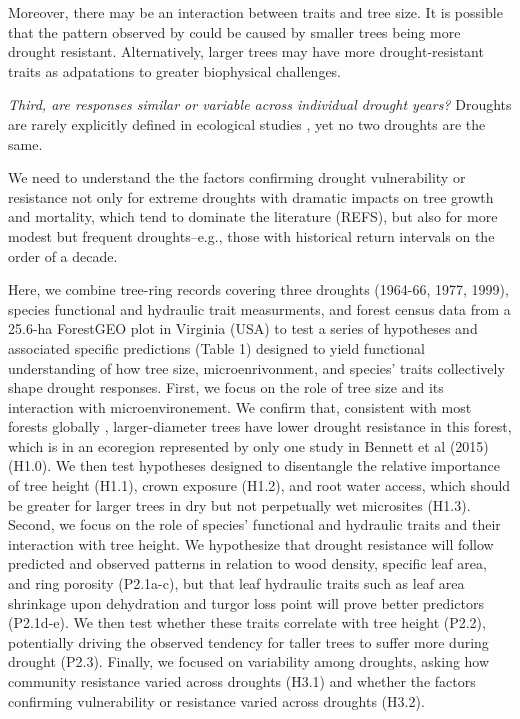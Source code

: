\documentclass[]{article}
\begin{document}
Moreover, there may be an interaction between traits and tree size. It
is possible that the pattern observed by \citet{bennett_larger_2015}
could be caused by smaller trees being more drought resistant.
Alternatively, larger trees may have more drought-resistant traits as
adpatations to greater biophysical challenges.

\emph{Third, are responses similar or variable across individual drought
years?} Droughts are rarely explicitly defined in ecological studies
\citep{slette_how_2019}, yet no two droughts are the same.

We need to understand the the factors confirming drought vulnerability
or resistance not only for extreme droughts with dramatic impacts on
tree growth and mortality, which tend to dominate the literature
\citep{bennett_larger_2015} (REFS), but also for more modest but
frequent droughts--e.g., those with historical return intervals on the
order of a decade.

Here, we combine tree-ring records covering three droughts (1964-66,
1977, 1999), species functional and hydraulic trait measurments, and
forest census data from a 25.6-ha ForestGEO plot in Virginia (USA) to
test a series of hypotheses and associated specific predictions (Table
1) designed to yield functional understanding of how tree size,
microenrivonment, and species' traits collectively shape drought
responses. First, we focus on the role of tree size and its interaction
with microenvironement. We confirm that, consistent with most forests
globally \citep{bennett_larger_2015}, larger-diameter trees have lower
drought resistance in this forest, which is in an ecoregion represented
by only one study in Bennett et al (2015) (H1.0). We then test
hypotheses designed to disentangle the relative importance of tree
height (H1.1), crown exposure (H1.2), and root water access, which
should be greater for larger trees in dry but not perpetually wet
microsites (H1.3). Second, we focus on the role of species' functional
and hydraulic traits and their interaction with tree height. We
hypothesize that drought resistance will follow predicted and observed
patterns in relation to wood density, specific leaf area, and ring
porosity (P2.1a-c), but that leaf hydraulic traits such as leaf area
shrinkage upon dehydration and turgor loss point will prove better
predictors (P2.1d-e). We then test whether these traits correlate with
tree height (P2.2), potentially driving the observed tendency for taller
trees to suffer more during drought (P2.3). Finally, we focused on
variability among droughts, asking how community resistance varied
across droughts (H3.1) and whether the factors confirming vulnerability
or resistance varied across droughts (H3.2).
\end{document}
